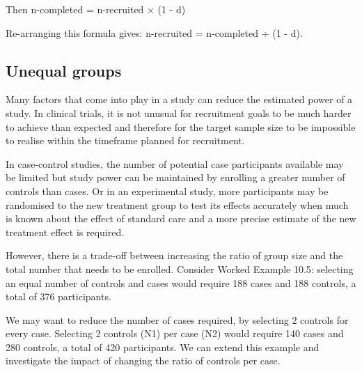 \documentclass[
  a4paper,
]{memoir}
\begin{document}
Then n-completed = n-recruited × (1 - d)

Re-arranging this formula gives: n-recruited = n-completed ÷ (1 - d).

\subsection{Unequal groups}\label{unequal-groups}

Many factors that come into play in a study can reduce the estimated
power of a study. In clinical trials, it is not unusual for recruitment
goals to be much harder to achieve than expected and therefore for the
target sample size to be impossible to realise within the timeframe
planned for recruitment.

In case-control studies, the number of potential case participants
available may be limited but study power can be maintained by enrolling
a greater number of controls than cases. Or in an experimental study,
more participants may be randomised to the new treatment group to test
its effects accurately when much is known about the effect of standard
care and a more precise estimate of the new treatment effect is
required.

However, there is a trade-off between increasing the ratio of group size
and the total number that needs to be enrolled. Consider Worked Example
10.5: selecting an equal number of controls and cases would require 188
cases and 188 controls, a total of 376 participants.

We may want to reduce the number of cases required, by selecting 2
controls for every case. Selecting 2 controls (N1) per case (N2) would
require 140 cases and 280 controls, a total of 420 participants. We can
extend this example and investigate the impact of changing the ratio of
controls per case.

\newpage
\end{document}
